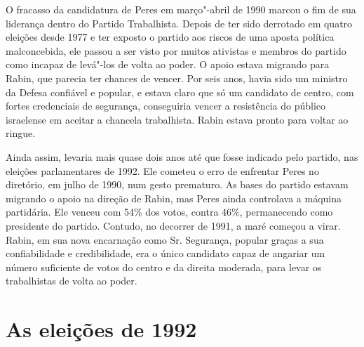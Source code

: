 O fracasso da candidatura de Peres em março"-abril de 1990 marcou o fim
de sua liderança dentro do Partido Trabalhista. Depois de ter sido
derrotado em quatro eleições desde 1977 e ter exposto o partido aos
riscos de uma aposta política malconcebida, ele passou a ser visto por
muitos ativistas e membros do partido como incapaz de levá"-los de volta
ao poder. O apoio estava migrando para Rabin, que parecia ter chances de
vencer. Por seis anos, havia sido um ministro da Defesa confiável e
popular, e estava claro que só um candidato de centro, com fortes
credenciais de segurança, conseguiria vencer a resistência do público
israelense em aceitar a chancela trabalhista. Rabin estava pronto para
voltar ao ringue.

Ainda assim, levaria mais quase dois anos até que fosse indicado pelo
partido, nas eleições parlamentares de 1992. Ele cometeu o erro de
enfrentar Peres no diretório, em julho de 1990, num gesto prematuro. As
bases do partido estavam migrando o apoio na direção de Rabin, mas Peres
ainda controlava a máquina partidária. Ele venceu com 54\% dos votos,
contra 46\%, permanecendo como presidente do partido. Contudo, no
decorrer de 1991, a maré começou a virar. Rabin, em sua nova encarnação
como Sr. Segurança, popular graças a sua confiabilidade e credibilidade,
era o único candidato capaz de angariar um número suficiente de votos do
centro e da direita moderada, para levar os trabalhistas de volta ao
poder.


\section{As eleições de 1992}

